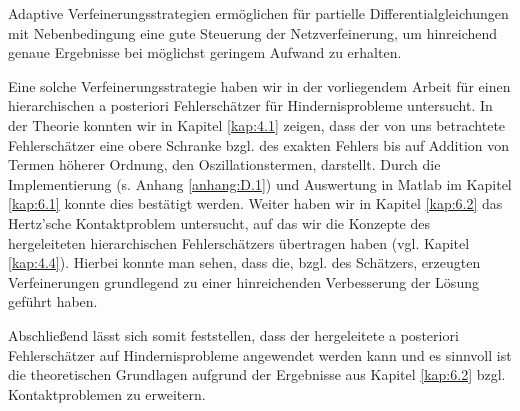 \label{kap:7}

Adaptive Verfeinerungsstrategien ermöglichen für partielle Differentialgleichungen mit Nebenbedingung eine gute Steuerung der Netzverfeinerung, um hinreichend genaue Ergebnisse bei möglichst geringem Aufwand zu erhalten.

Eine solche Verfeinerungsstrategie haben wir in der vorliegendem Arbeit für einen hierarchischen a posteriori Fehlerschätzer für Hindernisprobleme untersucht. In der Theorie konnten wir in Kapitel \ref{kap:4.1} zeigen, dass der von uns betrachtete Fehlerschätzer eine obere Schranke bzgl. des exakten Fehlers bis auf Addition von Termen höherer Ordnung, den Oszillationstermen, darstellt. Durch die Implementierung (s. Anhang \ref{anhang:D.1}) und Auswertung in Matlab im Kapitel \ref{kap:6.1} konnte dies bestätigt werden. Weiter haben wir in Kapitel \ref{kap:6.2} das Hertz'sche Kontaktproblem untersucht, auf das wir die Konzepte des hergeleiteten hierarchischen Fehlerschätzers übertragen haben (vgl. Kapitel \ref{kap:4.4}). Hierbei konnte man sehen, dass die, bzgl. des Schätzers, erzeugten Verfeinerungen grundlegend zu einer hinreichenden Verbesserung der Lösung geführt haben.

Abschließend lässt sich somit feststellen, dass der hergeleitete a posteriori Fehlerschätzer auf Hindernisprobleme  angewendet werden kann und es sinnvoll ist die theoretischen Grundlagen aufgrund der Ergebnisse aus Kapitel \ref{kap:6.2} bzgl. Kontaktproblemen zu erweitern.

\vspace{11pt}

